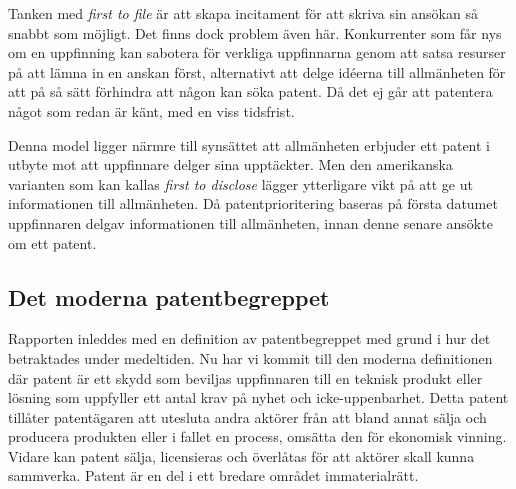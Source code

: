 Tanken med \emph{first to file} är att skapa incitament för att skriva sin ansökan så snabbt som möjligt. Det finns dock problem även här. Konkurrenter som får nys om en uppfinning kan sabotera för verkliga uppfinnarna genom att satsa resurser på att lämna in en anskan först, alternativt att delge idéerna till allmänheten för att på så sätt förhindra att någon kan söka patent. Då det ej går att patentera något som redan är känt, med en viss tidsfrist.

Denna model ligger närmre till synsättet att allmänheten erbjuder ett patent i utbyte mot att uppfinnare delger sina upptäckter. Men den amerikanska varianten som kan kallas \emph{first to disclose} lägger ytterligare vikt på att ge ut informationen till allmänheten. Då patentprioritering baseras på första datumet uppfinnaren delgav informationen till allmänheten, innan denne senare ansökte om ett patent.


\subsection{Det moderna patentbegreppet}

Rapporten inleddes med en definition av patentbegreppet med grund i hur det betraktades under medeltiden. Nu har vi kommit till den moderna definitionen där patent är ett skydd som beviljas uppfinnaren till en teknisk produkt eller lösning som uppfyller ett antal krav på nyhet och icke-uppenbarhet. Detta patent tillåter patentägaren att utesluta andra aktörer från att bland annat sälja och producera produkten eller i fallet en process, omsätta den för ekonomisk vinning. Vidare kan patent sälja, licensieras och överlåtas för att aktörer skall kunna sammverka. Patent är en del i ett bredare området immaterialrätt.